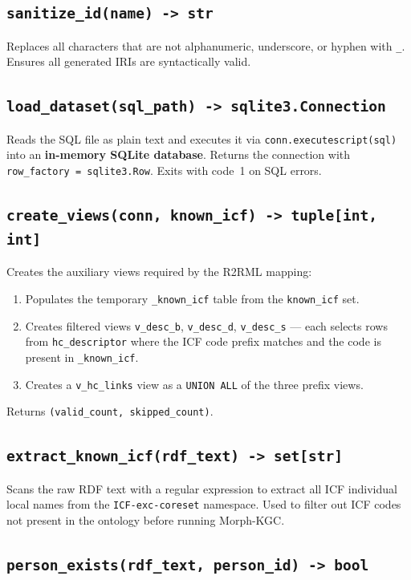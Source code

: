 ﻿\documentclass[12pt,a4paper]{article}
\begin{document}
\subsection{\texttt{sanitize\_id(name) -> str}}
Replaces all characters that are not alphanumeric, underscore, or hyphen with \texttt{\_}. Ensures all generated IRIs are syntactically valid.

\subsection{\texttt{load\_dataset(sql\_path) -> sqlite3.Connection}}
Reads the SQL file as plain text and executes it via \texttt{conn.executescript(sql)} into an \textbf{in-memory SQLite database}. Returns the connection with \texttt{row\_factory = sqlite3.Row}. Exits with code~1 on SQL errors.

\subsection{\texttt{create\_views(conn, known\_icf) -> tuple[int, int]}}

Creates the auxiliary views required by the R2RML mapping:

\begin{enumerate}[noitemsep]
  \item Populates the temporary \texttt{\_known\_icf} table from the \texttt{known\_icf} set.
  \item Creates filtered views \texttt{v\_desc\_b}, \texttt{v\_desc\_d}, \texttt{v\_desc\_s} --- each selects rows from \texttt{hc\_descriptor} where the ICF code prefix matches and the code is present in \texttt{\_known\_icf}.
  \item Creates a \texttt{v\_hc\_links} view as a \texttt{UNION ALL} of the three prefix views.
\end{enumerate}

Returns \texttt{(valid\_count, skipped\_count)}.

\subsection{\texttt{extract\_known\_icf(rdf\_text) -> set[str]}}

Scans the raw RDF text with a regular expression to extract all ICF individual local names from the \texttt{ICF-exc-coreset} namespace. Used to filter out ICF codes not present in the ontology before running Morph-KGC.

\subsection{\texttt{person\_exists(rdf\_text, person\_id) -> bool}}
\end{document}
